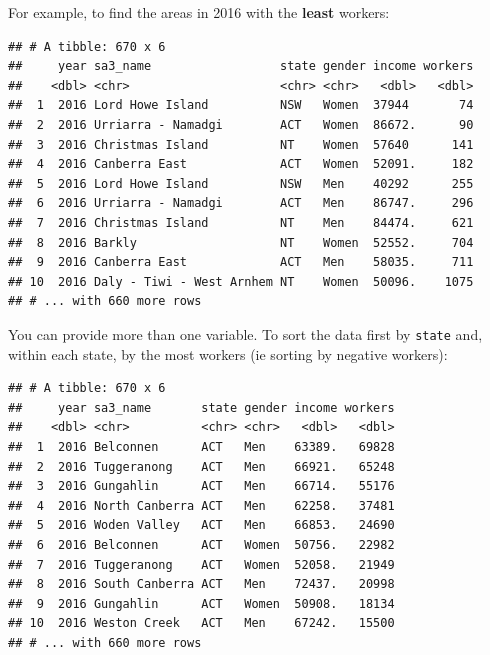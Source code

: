 \documentclass[]{book}
\newenvironment{Shaded}{\begin{snugshade}}{\end{snugshade}}
\newcommand{\DecValTok}[1]{\textcolor[rgb]{0.00,0.00,0.81}{#1}}
\newcommand{\KeywordTok}[1]{\textcolor[rgb]{0.13,0.29,0.53}{\textbf{#1}}}
\newcommand{\NormalTok}[1]{#1}
\newcommand{\OperatorTok}[1]{\textcolor[rgb]{0.81,0.36,0.00}{\textbf{#1}}}
\newcommand{\StringTok}[1]{\textcolor[rgb]{0.31,0.60,0.02}{#1}}
\begin{document}
For example, to find the areas in 2016 with the \textbf{least} workers:

\begin{Shaded}
\end{Shaded}

\begin{verbatim}
## # A tibble: 670 x 6
##     year sa3_name                  state gender income workers
##    <dbl> <chr>                     <chr> <chr>   <dbl>   <dbl>
##  1  2016 Lord Howe Island          NSW   Women  37944       74
##  2  2016 Urriarra - Namadgi        ACT   Women  86672.      90
##  3  2016 Christmas Island          NT    Women  57640      141
##  4  2016 Canberra East             ACT   Women  52091.     182
##  5  2016 Lord Howe Island          NSW   Men    40292      255
##  6  2016 Urriarra - Namadgi        ACT   Men    86747.     296
##  7  2016 Christmas Island          NT    Men    84474.     621
##  8  2016 Barkly                    NT    Women  52552.     704
##  9  2016 Canberra East             ACT   Men    58035.     711
## 10  2016 Daly - Tiwi - West Arnhem NT    Women  50096.    1075
## # ... with 660 more rows
\end{verbatim}

You can provide more than one variable. To sort the data first by \texttt{state} and, within each state, by the most workers (ie sorting by negative workers):

\begin{Shaded}
\end{Shaded}

\begin{verbatim}
## # A tibble: 670 x 6
##     year sa3_name       state gender income workers
##    <dbl> <chr>          <chr> <chr>   <dbl>   <dbl>
##  1  2016 Belconnen      ACT   Men    63389.   69828
##  2  2016 Tuggeranong    ACT   Men    66921.   65248
##  3  2016 Gungahlin      ACT   Men    66714.   55176
##  4  2016 North Canberra ACT   Men    62258.   37481
##  5  2016 Woden Valley   ACT   Men    66853.   24690
##  6  2016 Belconnen      ACT   Women  50756.   22982
##  7  2016 Tuggeranong    ACT   Women  52058.   21949
##  8  2016 South Canberra ACT   Men    72437.   20998
##  9  2016 Gungahlin      ACT   Women  50908.   18134
## 10  2016 Weston Creek   ACT   Men    67242.   15500
## # ... with 660 more rows
\end{verbatim}
\end{document}

